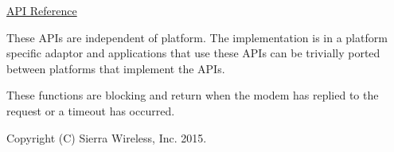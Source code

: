 \hyperlink{pa__antenna_8h}{A\+PI Reference}





These A\+P\+Is are independent of platform. The implementation is in a platform specific adaptor and applications that use these A\+P\+Is can be trivially ported between platforms that implement the A\+P\+Is.

These functions are blocking and return when the modem has replied to the request or a timeout has occurred.





Copyright (C) Sierra Wireless, Inc. 2015. 